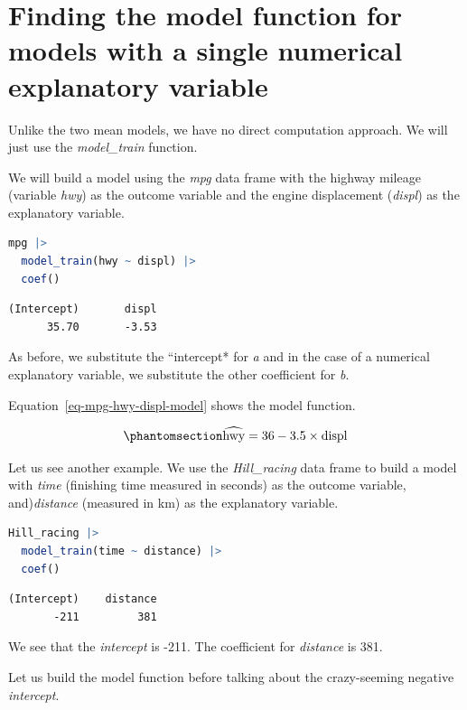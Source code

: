 \documentclass[
  12pt,
  letterpaper,
  DIV=11,
  numbers=noendperiod]{scrreprt}
\begin{document}
\section{Finding the model function for models with a single numerical
explanatory
variable}\label{finding-the-model-function-for-models-with-a-single-numerical-explanatory-variable}

Unlike the two mean models, we have no direct computation approach. We
will just use the \emph{model\_train} function.

We will build a model using the \emph{mpg} data frame with the highway
mileage (variable \emph{hwy}) as the outcome variable and the engine
displacement (\emph{displ}) as the explanatory variable.

\begin{lstlisting}[language=R]
mpg |> 
  model_train(hwy ~ displ) |> 
  coef()
\end{lstlisting}

\begin{lstlisting}
(Intercept)       displ 
      35.70       -3.53 
\end{lstlisting}

As before, we substitute the ``intercept* for \emph{a} and in the case
of a numerical explanatory variable, we substitute the other coefficient
for \emph{b}.

Equation~\ref{eq-mpg-hwy-displ-model} shows the model function.

\begin{equation}\phantomsection\label{eq-mpg-hwy-displ-model}{
\widehat{\text{hwy}} = 36 - 3.5\times \text{displ}
}\end{equation}

Let us see another example. We use the \emph{Hill\_racing} data frame to
build a model with \emph{time} (finishing time measured in seconds) as
the outcome variable, and)\emph{distance} (measured in km) as the
explanatory variable.

\begin{lstlisting}[language=R]
Hill_racing |> 
  model_train(time ~ distance) |> 
  coef()
\end{lstlisting}

\begin{lstlisting}
(Intercept)    distance 
       -211         381 
\end{lstlisting}

We see that the \emph{intercept} is -211. The coefficient for
\emph{distance} is 381.

Let us build the model function before talking about the crazy-seeming
negative \emph{intercept}.
\end{document}
